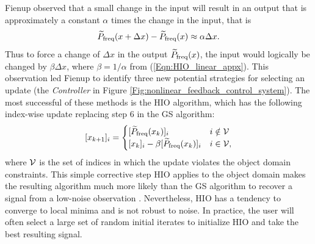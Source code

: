 Fienup observed that a small change in the input will result in an output that is approximately a constant $\alpha$ times the change in the input, that is
\begin{equation} 		\label{Eqn:HIO_linear_appx}
	\widetilde{P}_\textnormal{freq}(x + \Delta x) - \widetilde{P}_\textnormal{freq}(x) \approx \alpha \Delta x.
\end{equation}
Thus to force a change of $\Delta x$ in the output $\widetilde{P}_\textnormal{freq}(x)$, the input would logically be changed by $\beta \Delta x$, where $\beta = 1/\alpha$ from (\ref{Eqn:HIO_linear_appx}).  This observation led Fienup to identify three new potential strategies for selecting an update (the \textit{Controller} in Figure \ref{Fig:nonlinear_feedback_control_system}).  The most successful of these methods is the HIO algorithm, which has the following index-wise update replacing step 6 in the GS algorithm:
\begin{equation} 		\label{Eqn:HIO_step_6}
[x_{k+1}]_i =
	\begin{cases}
		[\widetilde{P}_\textnormal{freq}(x_k)]_i	&	i \notin {\mathcal V}		\\
		[x_k]_i - \beta [\widetilde{P}_\textnormal{freq}(x_k)]_i			&	 i \in {\mathcal V},
	\end{cases}
\end{equation}
where ${\mathcal V}$ is the set of indices in which the update violates the object domain constraints.  This simple corrective step HIO applies to the object domain makes the resulting algorithm much more likely than the GS algorithm to recover a signal from a low-noise observation \cite{DBLP:journals/corr/JaganathanEH15a}.   Nevertheless, HIO has a tendency to converge to local minima and is not robust to noise.  In practice, the user will often select a large set of random initial iterates to initialize HIO and take the best resulting signal.




